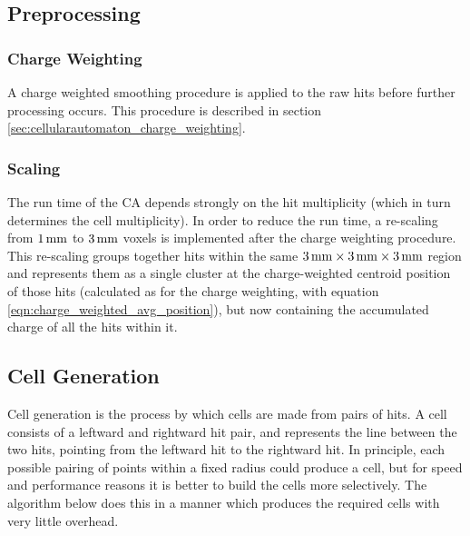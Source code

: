 \subsection{Preprocessing}\label{sec:cellularautomaton_preprocessing}
\subsubsection{Charge Weighting}\label{sec:cellularautomaton_preprocessing_charge_weighting}
A charge weighted smoothing procedure is applied to the raw hits before further processing occurs. This procedure is described in section \ref{sec:cellularautomaton_charge_weighting}.

\subsubsection{Scaling}\label{sec:cellularautomaton_scaling}
The run time of the \ac{CA} depends strongly on the hit multiplicity (which in turn determines the cell multiplicity). In order to reduce the run time, a re-scaling from $1\,\mathrm{mm}$ to $3\,\mathrm{mm}$ voxels is implemented after the charge weighting procedure. This re-scaling groups together hits within the same $3\,\mathrm{mm} \times 3\,\mathrm{mm} \times 3\,\mathrm{mm}$ region and represents them as a single cluster at the charge-weighted centroid position of those hits (calculated as for the charge weighting, with equation \ref{eqn:charge_weighted_avg_position}), but now containing the accumulated charge of all the hits within it.

\subsection{Cell Generation}\label{sec:cellularautomaton_cell_generation}
Cell generation is the process by which cells are made from pairs of hits. A cell consists of a leftward and rightward hit pair, and represents the line between the two hits, pointing from the leftward hit to the rightward hit.  In principle, each possible pairing of points within a fixed radius could produce a cell, but for speed and performance reasons it is better to build the cells more selectively. The algorithm below does this in a manner which produces the required cells with very little overhead.

